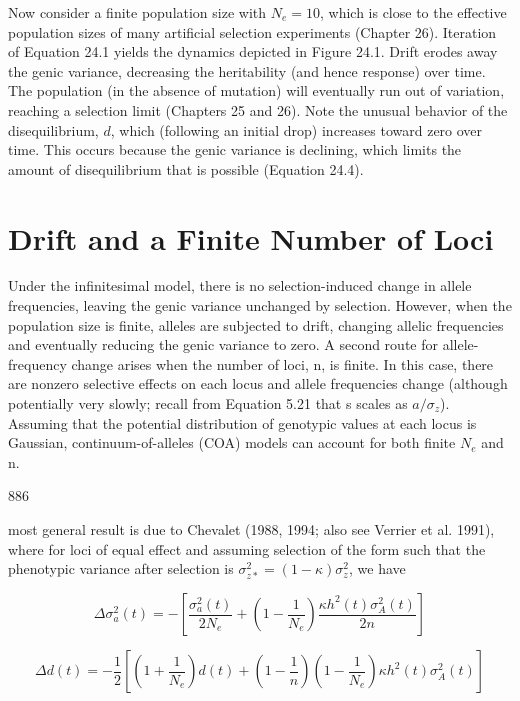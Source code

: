 \documentclass{article}
\begin{document}
Now consider a finite population size with  $ N_e = 10 $, which is close to the effective population sizes of many artificial selection experiments (Chapter 26). Iteration of Equation 24.1 yields the dynamics depicted in Figure 24.1. Drift erodes away the genic variance, decreasing the heritability (and hence response) over time. The population (in the absence of mutation) will eventually run out of variation, reaching a selection limit (Chapters 25 and 26). Note the unusual behavior of the disequilibrium,  $ d $, which (following an initial drop) increases toward zero over time. This occurs because the genic variance is declining, which limits the amount of disequilibrium that is possible (Equation 24.4).

\section{Drift and a Finite Number of Loci}
Under the infinitesimal model, there is no selection-induced change in allele frequencies, leaving the genic variance unchanged by selection. However, when the population size is finite, alleles are subjected to drift, changing allelic frequencies and eventually reducing the genic variance to zero. A second route for allele-frequency change arises when the number of loci, n, is finite. In this case, there are nonzero selective effects on each locus and allele frequencies change (although potentially very slowly; recall from Equation 5.21 that s scales as  $ a/\sigma_{z} $). Assuming that the potential distribution of genotypic values at each locus is Gaussian, continuum-of-alleles (COA) models can account for both finite  $ N_{e} $ and n.

886

most general result is due to Chevalet (1988, 1994; also see Verrier et al. 1991), where for loci of equal effect and assuming selection of the form such that the phenotypic variance after selection is  $ \sigma_{z*}^2 = (1 - \kappa) \sigma_z^2 $, we have

\begin{equation}
\Delta\sigma_{a}^{2}(t)=-\left[\frac{\sigma_{a}^{2}(t)}{2N_{e}}+\left(1-\frac{1}{N_{e}}\right)\frac{\kappa h^{2}(t)\sigma_{A}^{2}(t)}{2n}\right]
\tag{24.2a}
\label{eq:24_2a}
\end{equation}

\begin{equation}
\Delta d(t)=-\frac{1}{2}\left[\left(1+\frac{1}{N_{e}}\right)d(t)+\left(1-\frac{1}{n}\right)\left(1-\frac{1}{N_{e}}\right)\kappa h^{2}(t)\sigma_{A}^{2}(t)\right]
\tag{24.2b}
\label{eq:24_2b}
\end{equation}
\end{document}
